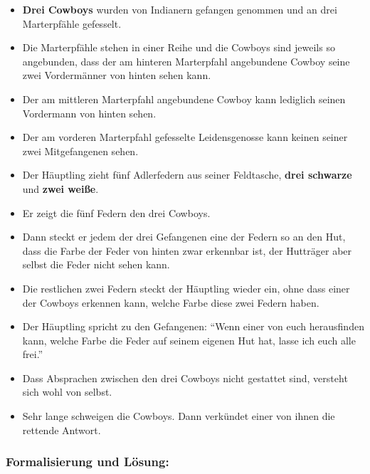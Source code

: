 \documentclass[11pt,a4paper]{paper}
\begin{document}
 \begin{itemize}
	\item \textbf{Drei Cowboys} wurden von Indianern gefangen genommen und an drei Marterpfähle gefesselt. 
 	\item Die Marterpfähle stehen in einer Reihe und die Cowboys sind jeweils so angebunden, dass der am hinteren Marterpfahl angebundene Cowboy seine zwei Vordermänner von hinten sehen kann. 
 \item Der am mittleren Marterpfahl angebundene Cowboy kann lediglich seinen Vordermann von hinten sehen. 
 \item Der am vorderen Marterpfahl gefesselte Leidensgenosse kann keinen seiner zwei Mitgefangenen sehen. 
 \item Der Häuptling zieht fünf Adlerfedern aus seiner Feldtasche, \textbf{drei schwarze} und \textbf{zwei weiße}. 
 \item Er zeigt die fünf Federn den drei Cowboys. 
 \item Dann steckt er jedem der drei Gefangenen eine der Federn so an den Hut, dass die Farbe der Feder von hinten zwar erkennbar ist, der Hutträger aber selbst die Feder nicht sehen kann. 
 \item Die restlichen zwei Federn steckt der Häuptling wieder ein, ohne dass einer der Cowboys erkennen kann, welche Farbe diese zwei Federn haben.
 \item Der Häuptling spricht zu den Gefangenen: \enquote{Wenn einer von euch herausfinden kann, welche Farbe die Feder auf seinem eigenen Hut hat, lasse ich euch alle frei.}
 \item Dass Absprachen zwischen den drei Cowboys nicht gestattet sind, versteht sich wohl von selbst.
  \item Sehr lange schweigen die Cowboys. Dann verkündet einer von ihnen die rettende Antwort.
\end{itemize}

\subsubsection*{Formalisierung und Lösung:}
\end{document}

